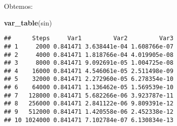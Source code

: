 \documentclass[]{article}
\newenvironment{Shaded}{\begin{snugshade}}{\end{snugshade}}
\newcommand{\KeywordTok}[1]{\textcolor[rgb]{0.13,0.29,0.53}{\textbf{#1}}}
\newcommand{\DataTypeTok}[1]{\textcolor[rgb]{0.13,0.29,0.53}{#1}}
\newcommand{\DecValTok}[1]{\textcolor[rgb]{0.00,0.00,0.81}{#1}}
\newcommand{\StringTok}[1]{\textcolor[rgb]{0.31,0.60,0.02}{#1}}
\newcommand{\CommentTok}[1]{\textcolor[rgb]{0.56,0.35,0.01}{\textit{#1}}}
\newcommand{\ControlFlowTok}[1]{\textcolor[rgb]{0.13,0.29,0.53}{\textbf{#1}}}
\newcommand{\OperatorTok}[1]{\textcolor[rgb]{0.81,0.36,0.00}{\textbf{#1}}}
\newcommand{\NormalTok}[1]{#1}
\begin{document}
\begin{Shaded}
\end{Shaded}

Obtemos:

\begin{Shaded}
\begin{Highlighting}[]
\KeywordTok{var_table}\NormalTok{(sin)}
\end{Highlighting}
\end{Shaded}

\begin{verbatim}
##      Steps     Var1         Var2         Var3
## 1     2000 0.841471 3.638441e-04 1.608766e-07
## 2     4000 0.841471 1.818766e-04 4.019905e-08
## 3     8000 0.841471 9.092691e-05 1.004725e-08
## 4    16000 0.841471 4.546061e-05 2.511498e-09
## 5    32000 0.841471 2.272960e-05 6.278354e-10
## 6    64000 0.841471 1.136462e-05 1.569539e-10
## 7   128000 0.841471 5.682266e-06 3.923787e-11
## 8   256000 0.841471 2.841122e-06 9.809391e-12
## 9   512000 0.841471 1.420558e-06 2.452338e-12
## 10 1024000 0.841471 7.102784e-07 6.130834e-13
\end{verbatim}
\end{document}
